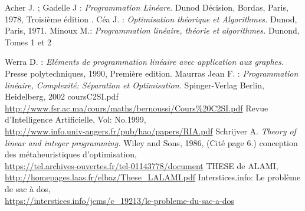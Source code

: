 \documentclass[a4paper,11pt,oneside]{report}
\theoremstyle{plain}
\newcommand{\0}{/ \! \! \! 0}
\theoremstyle{plain}
\begin{document}

\begin{thebibliography}{10}

Acher J. ; Gadelle J : 
\emph{Programmation Lin\'eare.} 
Dunod D\'ecision, Bordas, Paris, 1978, Troisi\`eme \'edition .
C\'ea J. : 
\emph{Optimisation th\'eorique et Algorithmes.}
Dunod, Paris, 1971.
Minoux M.:
\emph{Programmation lin\'eaire, th\'eorie et algorithmes.}
Dunond, Tomes 1 et 2

Werra D. :
\emph{El\'ements de programmation lin\'eaire avec application aux graphes.}
Presse polytechniques, 1990, Premi\`ere edition.
Maurras Jean F. :
\emph{Programmation lin\'eaire, Complexit\'e: S\'eparation et Optimisation.}
Spinger-Verlag Berlin, Heidelberg, 2002
coursC2SI.pdf \\
\url{http://www.fsr.ac.ma/cours/maths/bernoussi/Cours\%20C2SI.pdf}
Revue d'Intelligence Artificielle, Vol: No.1999,\\
\url{http://www.info.univ-angers.fr/pub/hao/papers/RIA.pdf}
Schrijver A. \label{Schrijver}
\emph{Theory of linear and integer programming.}
Wiley and Sons, 1986, (Cit\'e page 6.)
conception des m\'etaheuristiques d'optimisation,\\
\url{https://tel.archives-ouvertes.fr/tel-01143778/document}
THESE de ALAMI,\\
\url{http://homepages.laas.fr/elbaz/These_LALAMI.pdf}
Interstices.info: Le probl\`eme de sac \`a dos,\\
\url{https://interstices.info/jcms/c_19213/le-probleme-du-sac-a-dos }



\end{thebibliography}
\end{document}
